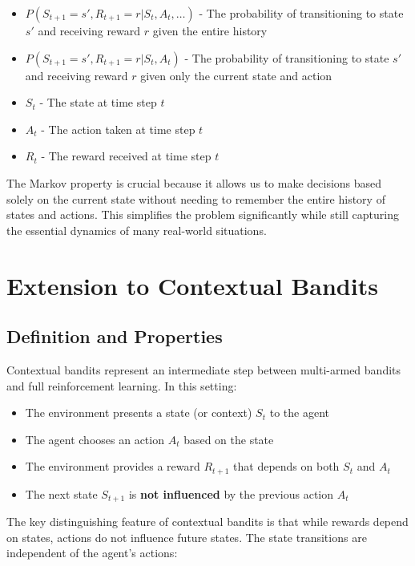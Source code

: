 \documentclass[12pt,a4paper]{article}
\begin{document}
\begin{tcolorbox}[title=Notation Overview]
\begin{itemize}
    \item $P(S_{t+1}=s', R_{t+1}=r | S_t, A_t, \ldots)$ - The probability of transitioning to state $s'$ and receiving reward $r$ given the entire history
    \item $P(S_{t+1}=s', R_{t+1}=r | S_t, A_t)$ - The probability of transitioning to state $s'$ and receiving reward $r$ given only the current state and action
    \item $S_t$ - The state at time step $t$
    \item $A_t$ - The action taken at time step $t$
    \item $R_t$ - The reward received at time step $t$
\end{itemize}
\end{tcolorbox}

The Markov property is crucial because it allows us to make decisions based solely on the current state without needing to remember the entire history of states and actions. This simplifies the problem significantly while still capturing the essential dynamics of many real-world situations.

\section{Extension to Contextual Bandits}
\subsection{Definition and Properties}

Contextual bandits represent an intermediate step between multi-armed bandits and full reinforcement learning. In this setting:

\begin{itemize}
    \item The environment presents a state (or context) $S_t$ to the agent
    \item The agent chooses an action $A_t$ based on the state
    \item The environment provides a reward $R_{t+1}$ that depends on both $S_t$ and $A_t$
    \item The next state $S_{t+1}$ is \textbf{not influenced} by the previous action $A_t$
\end{itemize}

The key distinguishing feature of contextual bandits is that while rewards depend on states, actions do not influence future states. The state transitions are independent of the agent's actions:
\end{document}
